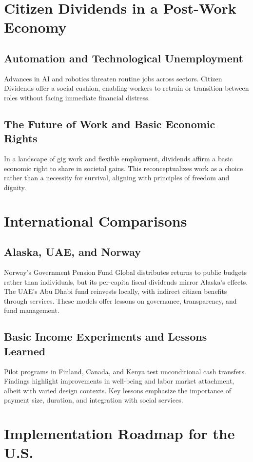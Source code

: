\documentclass[11pt]{article}
\begin{document}
\section{Citizen Dividends in a Post-Work Economy}
\subsection{Automation and Technological Unemployment}
Advances in AI and robotics threaten routine jobs across sectors. Citizen Dividends offer a social cushion, enabling workers to retrain or transition between roles without facing immediate financial distress.

\subsection{The Future of Work and Basic Economic Rights}
In a landscape of gig work and flexible employment, dividends affirm a basic economic right to share in societal gains. This reconceptualizes work as a choice rather than a necessity for survival, aligning with principles of freedom and dignity.

\section{International Comparisons}
\subsection{Alaska, UAE, and Norway}
Norway’s Government Pension Fund Global distributes returns to public budgets rather than individuals, but its per-capita fiscal dividends mirror Alaska’s effects. The UAE’s Abu Dhabi fund reinvests locally, with indirect citizen benefits through services. These models offer lessons on governance, transparency, and fund management.

\subsection{Basic Income Experiments and Lessons Learned}
Pilot programs in Finland, Canada, and Kenya test unconditional cash transfers. Findings highlight improvements in well-being and labor market attachment, albeit with varied design contexts. Key lessons emphasize the importance of payment size, duration, and integration with social services.

\section{Implementation Roadmap for the U.S.}
\end{document}
